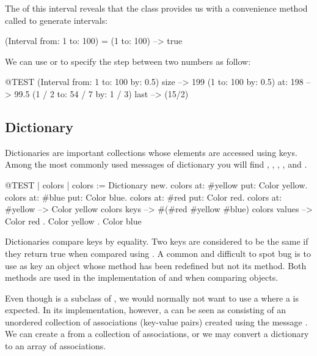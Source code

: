 \documentclass[a4paper,10pt,twoside]{book}
\begin{document}
\noindent
The  of this interval reveals that the class  provides us with a convenience method called  to generate intervals:

\begin{code}{}
(Interval from: 1 to: 100) = (1 to: 100) --> true
\end{code}

We can use  or  to specify the step between two numbers as follow:

\begin{code}{@TEST}
(Interval from: 1 to: 100 by: 0.5) size --> 199
(1 to: 100 by: 0.5) at: 198 --> 99.5
(1 / 2 to: 54 / 7 by: 1 / 3) last --> (15/2)
\end{code}

\subsection{Dictionary}
Dictionaries are important collections whose elements are accessed using keys.
Among the most commonly used messages of dictionary you will find , , , , and .

\begin{code}{@TEST | colors |}
colors := Dictionary new.
colors at: #yellow put: Color yellow.
colors at: #blue put: Color blue.
colors at: #red put: Color red.
colors at: #yellow --> Color yellow
colors keys          --> #(#red #yellow #blue)
colors values       -->  {Color red . Color yellow . Color blue}
\end{code}

Dictionaries compare keys by equality.
Two keys are considered to be the same if they return true when compared using \ct{=}.
A common and difficult to spot bug is to use as key an object whose \ct{=} method has been redefined but not its  method.
Both methods are used in the implementation of  and when comparing objects.

Even though  is a subclass of , we would normally not want to use a  where a  is expected.
In its implementation, however, a  can be seen as consisting of an unordered collection of associations (key-value pairs) created using the message .
We can create a  from a collection of associations, or we may convert a dictionary to an array of associations.
\end{document}
